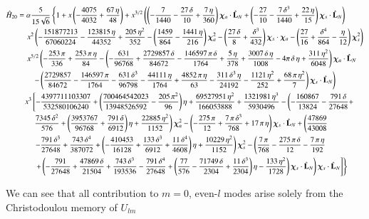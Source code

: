 \documentclass[prd,preprintnumbers,twocolumn,eqsecnum,floatfix,letter]{revtex4}
\begin{document}
\begin{widetext}
\begin{align}\label{eq:H20}
\hat{H}_{20} &= \alpha \frac{5}{15\sqrt{6}}\left\{ 1 + x\left(-\frac{4075}{4032} + \frac{67 \, \eta}{48}\right)+ x^{3/2}\left(\left(-\frac{7}{1440} -\frac{27 \, \delta}{10} + \frac{7 \,\eta}{360}\right)\bm{\chi}_a \cdot \hat{\mathbf{L}}_N+\left(-\frac{27}{10} -\frac{7 \, \delta^3}{1440} + \frac{22 \, \eta}{15}\right)\bm{\chi}_s \cdot \hat{\mathbf{L}}_N\right)\right. \nonumber \\
& \quad \left. x^2\left(-\frac{151877213}{67060224} -\frac{123815 \, \eta}{44352} +\frac{205 \, \eta^2}{352} -\left(\frac{1459}{864} -\frac{1441 \, \eta}{216}\right)\bm{\chi}_a^2 - \left(\frac{27 \, \delta}{8} +\frac{\delta^3}{432}\right)\bm{\chi}_s \cdot \bm{\chi}_a - \left(\frac{27}{16}+\frac{\delta^4}{864} -\frac{\eta}{12}\right)\bm{\chi}_s^2\right)\right. \nonumber \\
& \quad \left. x^{5/2}\left(-\frac{253 \, \pi}{336}+ \frac{253 \, \pi \, \eta}{84} -\left(-\frac{631}{96768} + \frac{2729857 \, \delta}{84672} -\frac{146597 \, \pi \, \delta}{1764}+\frac{5 \, \eta}{378}+\frac{3007 \, \delta \, \eta}{1008} -4\pi \, \delta \, \eta +\frac{311 \, \eta^2}{6048}\right)\bm{\chi}_a \cdot \hat{\mathbf{L}}_N\right.\right. \nonumber\\
& \qquad\left. -\left(\frac{2729857}{84672}-\frac{146597 \, \pi}{1764}-\frac{631 \, \delta^3 }{96798} -\frac{44111 \, \eta}{1764}+\frac{4852 \, \pi \, \eta}{63}-\frac{311 \, \delta^3 \, \eta}{24192}-\frac{1121 \, \eta^2}{252} +\frac{68 \, \pi \, \eta^2}{7}\right)\bm{\chi}_s \cdot \hat{\mathbf{L}}_N\right) \nonumber \\
& \quad  x^3\left[-\frac{4397711103307}{532580106240} + \left( \frac{700464542023}{13948526592} - \frac{205 \, \pi^2}{96}\right)\eta + \frac{69527951 \, \eta^2}{166053888} + \frac{1321981 \, \eta^3}{5930496} -  \left(-\frac{160867}{13824} -\frac{791 \, \delta}{27648} + \right.\right. \nonumber \\
& \qquad \left. \frac{7345 \, \delta^2}{576} + \left(\frac{3953767}{96768}+\frac{791 \, \delta}{6912}\right)\eta + \frac{22885 \, \eta^2}{1152}\right)\bm{\chi}_a^2 -\left(-\frac{275 \, \pi}{12} + \frac{7 \, \pi \, \delta^3}{768} + 17 \, \pi \, \eta \right)\bm{\chi}_s \cdot \hat{\mathbf{L}}_N + \left(\frac{47869}{43008}  \right.\nonumber\\
& \qquad \left.\left. - \frac{791 \, \delta^3}{27648} + \frac{743 \, \delta^4}{387072} + \left(-\frac{410453}{16128} + \frac{133 \, \delta^3}{6912} + \frac{11 \, \delta^4}{4608}\right)\eta + \frac{10229 \, \eta^2}{1152}\right)\bm{\chi}_s^2 - \left( \frac{7 \, \pi}{768}-\frac{275 \, \pi \, \delta}{12}-\frac{7 \, \pi \, \eta}{192}\right.\right. \nonumber \\
&\qquad \left.\left.\left. + \left(-\frac{791}{27648} + \frac{47869 \, \delta}{21504} + \frac{743 \, \delta^3}{193536} - \frac{791 \, \delta^4}{27648} + \left(\frac{77}{576} - \frac{71749 \, \delta}{2304} + \frac{11 \, \delta^3}{2304}\right)\eta - \frac{133 \, \eta^2}{1728}\right)\bm{\chi}_s \cdot \hat{\mathbf{L}}_N\right)\bm{\chi}_s \cdot \hat{\mathbf{L}}_N
\right]
\right\}
\end{align}
\end{widetext}
We can see that all contribution to $m=0$, even-$l$ modes arise solely from the Christodoulou memory of $U_{lm}$
\end{document}
